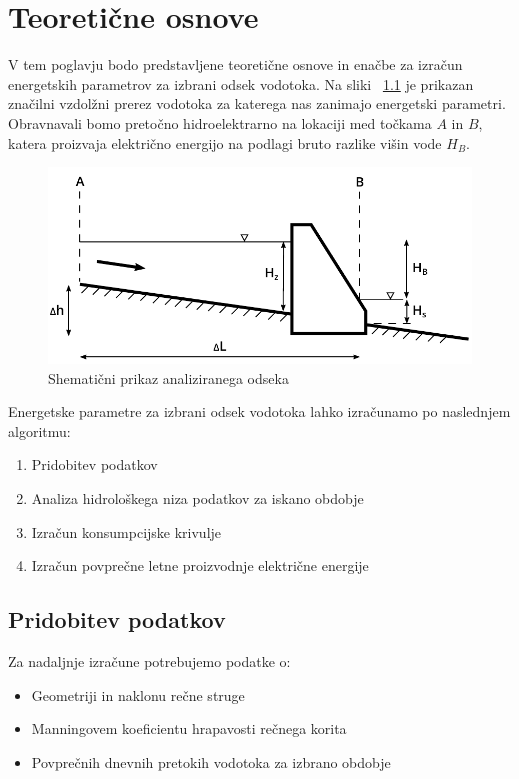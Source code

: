 \chapter{Teoretične osnove}

V tem poglavju bodo predstavljene teoretične osnove in enačbe za izračun energetskih parametrov za izbrani odsek vodotoka. Na sliki ~\ref{fig:uvodna_slika} je prikazan značilni vzdolžni prerez vodotoka za katerega nas zanimajo energetski parametri. Obravnavali bomo pretočno hidroelektrarno na lokaciji med točkama $A$ in $B$, katera proizvaja električno energijo na podlagi bruto razlike višin vode $H_B$. 



\begin{figure}[ht!]
	\begin{centering}
		\includegraphics{slike/uvod/uvodna_slika.pdf}		
		\caption{Shematični prikaz analiziranega odseka}\label{fig:uvodna_slika}
	\end{centering}
\end{figure}





Energetske parametre za izbrani odsek vodotoka lahko izračunamo po naslednjem algoritmu:
\begin{enumerate}[noitemsep, topsep=0pt]
	\item Pridobitev podatkov
	\item Analiza hidrološkega niza podatkov za iskano obdobje
	\item Izračun konsumpcijske krivulje
	\item Izračun povprečne letne proizvodnje električne energije
\end{enumerate}


\newpage
\section{Pridobitev podatkov} \label{sec:teorija_pridobitevPodatkov}
Za nadaljnje izračune potrebujemo podatke o:
\begin{itemize}[noitemsep, topsep=0pt]
	\item Geometriji in naklonu rečne struge
	\item Manningovem koeficientu hrapavosti rečnega korita
	\item Povprečnih dnevnih pretokih vodotoka za izbrano obdobje
\end{itemize}


